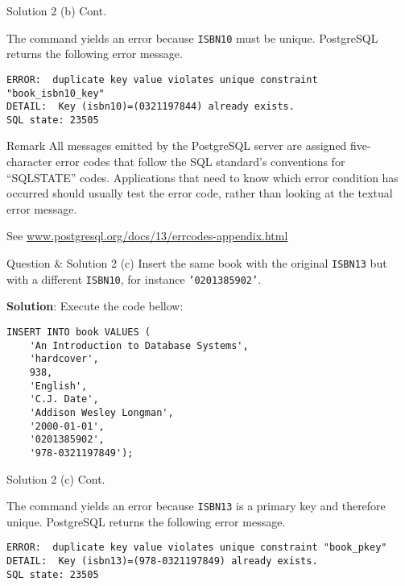 \begin{frame}[fragile]{Solution 2 (b) Cont.}

The command yields an error  because \texttt{ISBN10} must be unique. PostgreSQL returns the following error message.

\begin{lstlisting}[style=error]
ERROR:  duplicate key value violates unique constraint "book_isbn10_key"
DETAIL:  Key (isbn10)=(0321197844) already exists.
SQL state: 23505
\end{lstlisting}

\begin{block}{Remark} 
All messages emitted by the PostgreSQL server are assigned five-character error codes that follow the SQL standard's conventions for ``SQLSTATE'' codes. Applications that need to know which error condition has occurred should usually test the error code, rather than looking at the textual error message. \vspace{10pt}

See \url{www.postgresql.org/docs/13/errcodes-appendix.html}
\end{block}
\end{frame}

\begin{frame}[fragile]{Question \& Solution 2 (c)}
Insert the same book  with the original \texttt{ISBN13} but with a different \texttt{ISBN10}, for instance \texttt{'0201385902'}.\vspace{10pt}

\textbf{Solution}: Execute the code bellow:

\begin{lstlisting}
INSERT INTO book VALUES (
	'An Introduction to Database Systems', 
	'hardcover',
	938,
	'English',
	'C.J. Date',
	'Addison Wesley Longman',
	'2000-01-01',
	'0201385902',
	'978-0321197849');
\end{lstlisting}

\end{frame}

\begin{frame}[fragile]{Solution 2 (c) Cont.}

The command yields an error  because  \texttt{ISBN13} is a primary key and therefore unique. PostgreSQL returns the following error message.

\begin{lstlisting}[style=error]
ERROR:  duplicate key value violates unique constraint "book_pkey"
DETAIL:  Key (isbn13)=(978-0321197849) already exists.
SQL state: 23505
\end{lstlisting}
\end{frame}

